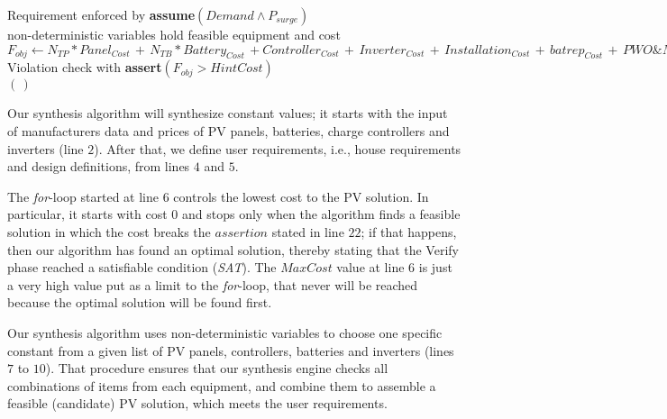 \begin{algorithm}
\begin{algorithmic}[1]
	\STATE Requirement enforced by \textbf{assume}$(Demand \wedge P_{surge})$ \\
	\STATE non-deterministic variables hold feasible equipment and cost  \\
	\STATE $F_{obj} \leftarrow  N_{TP}*Panel_{Cost} \, + \, N_{TB}*Battery_{Cost} \, + Controller_{Cost} \, + \, Inverter_{Cost} \, + \, Installation_{Cost} \, + \, batrep_{Cost} \, + \, PWO\&M_{Cost}$ \\
	\STATE Violation check with \textbf{assert}$(F_{obj} > HintCost)$ \\
  \ENDFOR
 \RETURN $(\,)$ 
 \end{algorithmic} 
 \label{alg:opt-algorithm}
 \end{algorithm}
%

Our synthesis algorithm will synthesize constant values; 
it starts with the input of manufacturers data and prices of PV panels, batteries, 
charge controllers and inverters (line $2$). After that, we define user requirements, i.e., 
house requirements and design definitions, from lines $4$ and $5$. 

The \textit{for}-loop started at line $6$ controls the lowest cost to the PV solution. 
In particular, it starts with cost $0$ and stops only when the algorithm finds a 
feasible solution in which the cost breaks the $assertion$ stated in line $22$; 
if that happens, then our algorithm has found an optimal solution, thereby stating 
that the {\sc Verify} phase reached a satisfiable condition (\textit{SAT}). 
The $MaxCost$ value at line $6$ is just a very high value put as a limit 
to the \textit{for}-loop, that never will be reached because the optimal solution will be found first.

Our synthesis algorithm uses non-deterministic variables to choose one specific constant 
from a given list of PV panels, controllers, batteries and inverters (lines $7$ to $10$). 
That procedure ensures that our synthesis engine checks all combinations of items 
from each equipment, and combine them to assemble a feasible (candidate) PV solution, 
which meets the user requirements.

